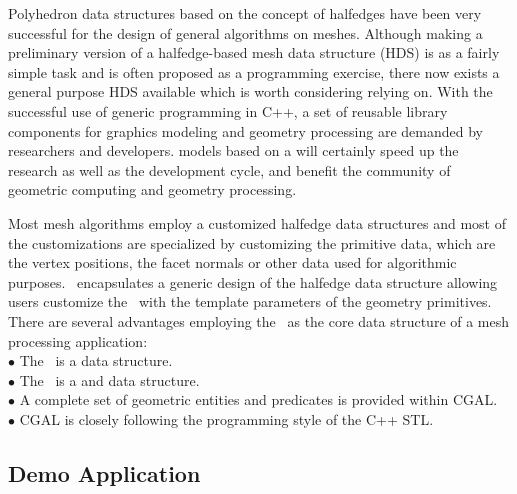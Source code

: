 \documentclass[letter,twocolumn]{article}
\begin{document}
Polyhedron data structures based on the concept of halfedges have been
very successful for the design of general algorithms on meshes.
Although making a preliminary version of a halfedge-based mesh data
structure (HDS) is as a fairly simple task and is often proposed as a
programming exercise, there now exists a general purpose HDS available
which is worth considering relying on. With the successful use of
generic programming in C++, a set of reusable library components for
graphics modeling and geometry processing are demanded by researchers
and developers.  models based on a
will certainly speed up the research as well as the development cycle,
and benefit the community of geometric computing and geometry
processing.

Most mesh algorithms employ a customized halfedge data structures and
most of the customizations are specialized by customizing the
primitive data, which are the vertex positions, the facet normals or
other data used for algorithmic purposes. \cgalpoly\ encapsulates a
generic design of the halfedge data structure allowing users customize
the \poly\ with the template parameters of the geometry
primitives. There are several advantages employing the \poly\ as the
core data structure of a mesh processing application: \\

\indent $\bullet$ The \poly\ is a  data structure.\\
\indent $\bullet$ The \poly\ is a  and  
                  data structure.\\
\indent $\bullet$ A complete set of geometric entities and predicates
                  is provided within CGAL.\\
\indent $\bullet$ CGAL is closely following the programming 
                  style of the C++ STL.


\subsection*{Demo Application}
\end{document}
